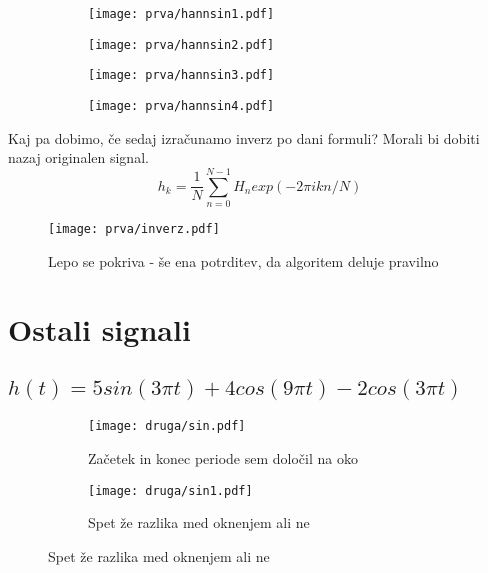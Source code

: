 \documentclass{article}
\begin{document}
\begin{figure}[H]
\begin{subfigure}{.5\textwidth}
\texttt{[image: prva/hannsin1.pdf]}
\end{subfigure}
\begin{subfigure}{.5\textwidth}
\texttt{[image: prva/hannsin2.pdf]}
\end{subfigure}
\end{figure}
\begin{figure}[H]
\begin{subfigure}{.5\textwidth}
\texttt{[image: prva/hannsin3.pdf]}
\end{subfigure}
\begin{subfigure}{.5\textwidth}
\texttt{[image: prva/hannsin4.pdf]}
\end{subfigure}
\end{figure}

Kaj pa dobimo, če sedaj izračunamo inverz po dani formuli? Morali bi dobiti nazaj originalen signal.
\begin{equation*}
h_k = \frac{1}{N} \sum_{n=0}^{N-1}H_n exp(-2\pi i k n/N)
\end{equation*}
\begin{figure}[H]
\texttt{[image: prva/inverz.pdf]}
\caption*{Lepo se pokriva - še ena potrditev, da algoritem deluje pravilno}
\end{figure}

\section{Ostali signali}
\subsection{$h(t) = 5sin(3\pi t) + 4cos(9\pi t) - 2cos(3\pi t)$}
\begin{figure}[H]
\begin{subfigure}{.5\textwidth}
\texttt{[image: druga/sin.pdf]}
\caption*{Začetek in konec periode sem določil na oko}
\end{subfigure}
\begin{subfigure}{.5\textwidth}
\texttt{[image: druga/sin1.pdf]}
\caption*{Spet že razlika med oknenjem ali ne}
\end{subfigure}
\end{figure}
\end{document}
